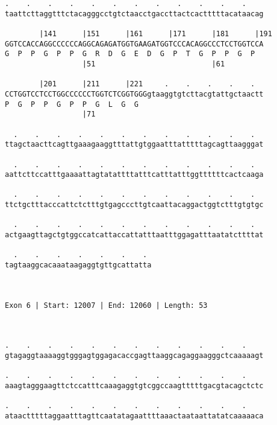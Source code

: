 \documentclass{article}
\begin{document}
\begin{Verbatim}
.    .    .    .    .    .    .    .    .    .    .    .    
taattcttaggtttctacagggcctgtctaacctgaccttactcactttttacataacag
                                                            
        |141      |151      |161      |171      |181      |191
GGTCCACCAGGCCCCCCAGGCAGAGATGGTGAAGATGGTCCCACAGGCCCTCCTGGTCCA
G  P  P  G  P  P  G  R  D  G  E  D  G  P  T  G  P  P  G  P  
                  |51                           |61         
  
        |201      |211      |221     .    .    .    .    .  
CCTGGTCCTCCTGGCCCCCCTGGTCTCGGTGGGgtaaggtgtcttacgtattgctaactt
P  G  P  P  G  P  P  G  L  G  G                             
                  |71                                       
  
  .    .    .    .    .    .    .    .    .    .    .    .  
ttagctaacttcagttgaaagaaggtttattgtggaatttatttttagcagttaagggat
                                                            
  .    .    .    .    .    .    .    .    .    .    .    .  
aattcttccatttgaaaattagtatattttatttcatttatttggttttttcactcaaga
                                                            
  .    .    .    .    .    .    .    .    .    .    .    .  
ttctgctttacccattctctttgtgagcccttgtcaattacaggactggtctttgtgtgc
                                                            
  .    .    .    .    .    .    .    .    .    .    .    .  
actgaagttagctgtggccatcattaccattatttaatttggagatttaatatcttttat
                                                            
  .    .    .    .    .    .    . 
tagtaaggcacaaataagaggtgttgcattatta
                                  
                                  
 
Exon 6 | Start: 12007 | End: 12060 | Length: 53



.    .    .    .    .    .    .    .    .    .    .    .    
gtagaggtaaaaggtgggagtggagacaccgagttaaggcagaggaagggctcaaaaagt
                                                            
.    .    .    .    .    .    .    .    .    .    .    .    
aaagtagggaagttctccatttcaaagaggtgtcggccaagtttttgacgtacagctctc
                                                            
.    .    .    .    .    .    .    .    .    .    .    .    
ataactttttaggaatttagttcaatatagaattttaaactaataattatatcaaaaaca
                                                            

\end{Verbatim}
\end{document}
